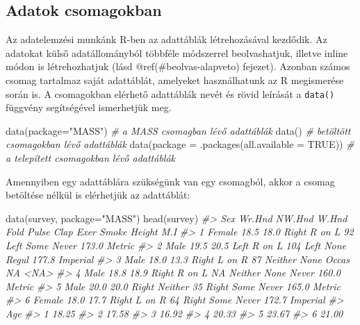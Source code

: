 \documentclass[
]{book}
\newenvironment{Shaded}{\begin{snugshade}}{\end{snugshade}}
\newcommand{\AttributeTok}[1]{\textcolor[rgb]{0.77,0.63,0.00}{#1}}
\newcommand{\CommentTok}[1]{\textcolor[rgb]{0.56,0.35,0.01}{\textit{#1}}}
\newcommand{\ConstantTok}[1]{\textcolor[rgb]{0.00,0.00,0.00}{#1}}
\newcommand{\FunctionTok}[1]{\textcolor[rgb]{0.00,0.00,0.00}{#1}}
\newcommand{\NormalTok}[1]{#1}
\newcommand{\StringTok}[1]{\textcolor[rgb]{0.31,0.60,0.02}{#1}}
\begin{document}
\hypertarget{adatok-csomagokban}{%
\subsection{Adatok csomagokban}\label{adatok-csomagokban}}

Az adatelemzési munkánk R-ben az adattáblák létrehozásával kezdődik. Az adatokat külső adatállományból többféle módszerrel beolvashatjuk, illetve inline módon is létrehozhatjuk (lásd @ref(\#beolvas-alapveto) fejezet). Azonban számos csomag tartalmaz saját adattáblát, amelyeket használhatunk az R megismerése során is. A csomagokban elérhető adattáblák nevét és rövid leírását a \texttt{data()} függvény segítségével ismerhetjük meg.

\begin{Shaded}
\begin{Highlighting}[]
\FunctionTok{data}\NormalTok{(}\AttributeTok{package=}\StringTok{"MASS"}\NormalTok{)                            }\CommentTok{\# a MASS csomagban lévő adattáblák}
\FunctionTok{data}\NormalTok{()                                          }\CommentTok{\# betöltött csomagokban lévő adattáblák}
\FunctionTok{data}\NormalTok{(}\AttributeTok{package =} \FunctionTok{.packages}\NormalTok{(}\AttributeTok{all.available =} \ConstantTok{TRUE}\NormalTok{)) }\CommentTok{\# a telepített csomagokban lévő adattáblák}
\end{Highlighting}
\end{Shaded}

Amennyiben egy adattáblára szükségünk van egy csomagból, akkor a csomag betöltése nélkül is elérhetjük az adattáblát:

\begin{Shaded}
\begin{Highlighting}[]
\FunctionTok{data}\NormalTok{(survey, }\AttributeTok{package=}\StringTok{"MASS"}\NormalTok{)}
\FunctionTok{head}\NormalTok{(survey)}
\CommentTok{\#\textgreater{}      Sex Wr.Hnd NW.Hnd W.Hnd    Fold Pulse    Clap Exer Smoke Height      M.I}
\CommentTok{\#\textgreater{} 1 Female   18.5   18.0 Right  R on L    92    Left Some Never  173.0   Metric}
\CommentTok{\#\textgreater{} 2   Male   19.5   20.5  Left  R on L   104    Left None Regul  177.8 Imperial}
\CommentTok{\#\textgreater{} 3   Male   18.0   13.3 Right  L on R    87 Neither None Occas     NA     \textless{}NA\textgreater{}}
\CommentTok{\#\textgreater{} 4   Male   18.8   18.9 Right  R on L    NA Neither None Never  160.0   Metric}
\CommentTok{\#\textgreater{} 5   Male   20.0   20.0 Right Neither    35   Right Some Never  165.0   Metric}
\CommentTok{\#\textgreater{} 6 Female   18.0   17.7 Right  L on R    64   Right Some Never  172.7 Imperial}
\CommentTok{\#\textgreater{}     Age}
\CommentTok{\#\textgreater{} 1 18.25}
\CommentTok{\#\textgreater{} 2 17.58}
\CommentTok{\#\textgreater{} 3 16.92}
\CommentTok{\#\textgreater{} 4 20.33}
\CommentTok{\#\textgreater{} 5 23.67}
\CommentTok{\#\textgreater{} 6 21.00}
\end{Highlighting}
\end{Shaded}
\end{document}
